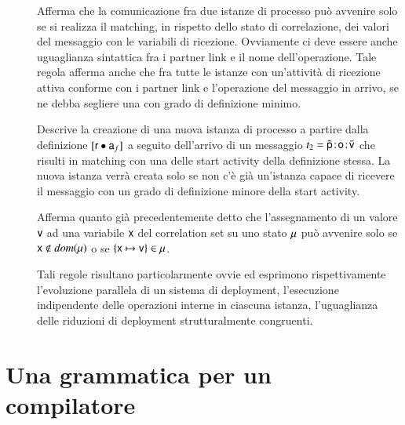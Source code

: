 \begin{description}
\item[] Afferma che la comunicazione fra due istanze di
 processo può avvenire solo se si realizza il matching, in rispetto dello stato
 di correlazione, dei valori del messaggio con le variabili di ricezione.
 Ovviamente ci deve essere anche uguaglianza sintattica fra i partner link e
 il nome dell'operazione. Tale regola afferma anche che fra tutte le istanze
 con un'attività di ricezione attiva conforme con i partner link e l'operazione
 del messaggio in arrivo, se ne debba segliere una con grado di
 definizione minimo.
 \item[] Descrive la creazione di una nuova istanza di
 processo a partire dalla definizione $[{\sf r} \bullet {\sf a}_f]$ a seguito
 dell'arrivo di un messaggio $t_2 =
  \tilde{{\sf p}}\! : \! {\sf o}\! : \! \bar{{\sf v}}$ che risulti in matching con una delle start activity della
 definizione stessa. La nuova istanza verrà creata solo se non
 c'è già un'istanza capace di ricevere il messaggio con un grado di
 definizione minore della start activity.
 \item[] Afferma quanto già precedentemente detto che
 l'assegnamento di un valore ${\sf v}$ ad una variabile ${\sf x}$ del correlation set
 su uno stato ${\sf \mu}$ può avvenire solo se $ {\sf x} \notin dom({\sf \mu})$ o se $
 \{{\sf x} \mapsto {\sf v}\} \in {\sf \mu}$.
 \item[  ]
 Tali regole risultano particolarmente ovvie ed esprimono rispettivamente
 l'evoluzione parallela di un sistema di deployment, l'esecuzione
 indipendente delle operazioni interne in ciascuna istanza, l'uguaglianza delle
 riduzioni di deployment strutturalmente congruenti.
\end{description}

\section{Una grammatica per un compilatore 
}
\label{gram}

